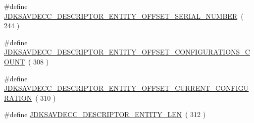 \begin{DoxyCompactItemize}
\item 
\#define \hyperlink{group__descriptor__entity_ga56ab4245e615e9a0f1bda19e57c2e685}{J\+D\+K\+S\+A\+V\+D\+E\+C\+C\+\_\+\+D\+E\+S\+C\+R\+I\+P\+T\+O\+R\+\_\+\+E\+N\+T\+I\+T\+Y\+\_\+\+O\+F\+F\+S\+E\+T\+\_\+\+S\+E\+R\+I\+A\+L\+\_\+\+N\+U\+M\+B\+ER}~( 244 )
\item 
\#define \hyperlink{group__descriptor__entity_ga7b5e289d78c1df2e7d698c9e20276d39}{J\+D\+K\+S\+A\+V\+D\+E\+C\+C\+\_\+\+D\+E\+S\+C\+R\+I\+P\+T\+O\+R\+\_\+\+E\+N\+T\+I\+T\+Y\+\_\+\+O\+F\+F\+S\+E\+T\+\_\+\+C\+O\+N\+F\+I\+G\+U\+R\+A\+T\+I\+O\+N\+S\+\_\+\+C\+O\+U\+NT}~( 308 )
\item 
\#define \hyperlink{group__descriptor__entity_ga35c7e4039fbdfd1d5f2ccd3cce03ae42}{J\+D\+K\+S\+A\+V\+D\+E\+C\+C\+\_\+\+D\+E\+S\+C\+R\+I\+P\+T\+O\+R\+\_\+\+E\+N\+T\+I\+T\+Y\+\_\+\+O\+F\+F\+S\+E\+T\+\_\+\+C\+U\+R\+R\+E\+N\+T\+\_\+\+C\+O\+N\+F\+I\+G\+U\+R\+A\+T\+I\+ON}~( 310 )
\item 
\#define \hyperlink{group__descriptor__entity_ga552cb1772e36c821ac821ba95d69d52b}{J\+D\+K\+S\+A\+V\+D\+E\+C\+C\+\_\+\+D\+E\+S\+C\+R\+I\+P\+T\+O\+R\+\_\+\+E\+N\+T\+I\+T\+Y\+\_\+\+L\+EN}~( 312 )
\end{DoxyCompactItemize}
